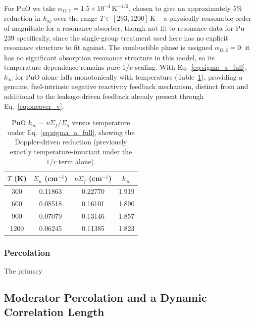 \documentclass[12pt]{article}
\begin{document}
For PuO we take $\alpha_{D,1} = 1.5\times10^{-3}\,\mathrm{K}^{-1/2}$,
chosen to give an approximately $5\%$ reduction in $k_\infty$ over the
range $T \in [293, 1200]\,\mathrm{K}$ -- a physically reasonable order
of magnitude for a resonance absorber, though not fit to resonance
data for Pu-239 specifically, since the single-group treatment used
here has no explicit resonance structure to fit against. The
combustible phase is assigned $\alpha_{D,2} = 0$: it has no
significant absorption resonance structure in this model, so its
temperature dependence remains pure $1/v$ scaling. With
Eq.~\eqref{eq:sigma_a_full}, $k_\infty$ for PuO alone falls
monotonically with temperature
(Table~\ref{tab:doppler_kinf}), providing a genuine, fuel-intrinsic
negative reactivity feedback mechanism, distinct from and additional
to the leakage-driven feedback already present through
Eq.~\eqref{eq:oneover_v}.

\begin{table}[h]
\centering
\begin{tabular}{cccc}
\hline
$T$ (K) & $\Sigma_a$ (cm$^{-1}$) & $\nu\Sigma_f$ (cm$^{-1}$) & $k_\infty$ \\
\hline
300  & 0.11863 & 0.22770 & 1.919 \\
600  & 0.08518 & 0.16101 & 1.890 \\
900  & 0.07079 & 0.13146 & 1.857 \\
1200 & 0.06245 & 0.11385 & 1.823 \\
\hline
\end{tabular}
\caption{PuO $k_\infty = \nu\Sigma_f/\Sigma_a$ versus temperature
under Eq.~\eqref{eq:sigma_a_full}, showing the Doppler-driven
reduction (previously exactly temperature-invariant under the $1/v$
term alone).}
\label{tab:doppler_kinf}
\end{table}

\subsubsection{Percolation}
The primary


\subsection{Moderator Percolation and a Dynamic Correlation Length}
\end{document}
